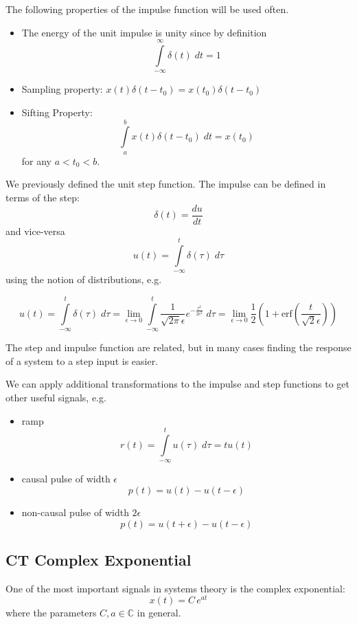 The following properties of the impulse function will be used often.

\begin{itemize}
\item The energy of the unit impulse is unity since by definition
  \[
  \int\limits_{-\infty}^{\infty} \delta(t) \; dt = 1
  \]
\item Sampling property: $x(t)\delta(t-t_0) = x(t_0)\delta(t-t_0)$
\item Sifting Property:
  \[
  \int\limits_{a}^{b} x(t)\delta(t-t_0) \; dt = x(t_0)
  \]
  for any $a < t_0 < b$.
\end{itemize}

We previously defined the unit step function. The impulse can be defined in terms of the step:
\[
\delta(t) = \frac{du}{dt}
\]
and vice-versa
\[
u(t) = \int\limits_{-\infty}^{t} \delta(\tau) \; d\tau
\]
using the notion of distributions, e.g.

\[
u(t) = \int\limits_{-\infty}^{t} \delta(\tau) \; d\tau = \lim_{\epsilon \rightarrow 0} \int\limits_{-\infty}^{t} \frac{1}{\sqrt{2\pi}\epsilon} e^{-\frac{\tau^2}{2\epsilon^2}} \; d\tau = \lim_{\epsilon \rightarrow 0} \frac{1}{2}\left(1+\text{erf}\left( \frac{t}{\sqrt{2}\epsilon}\right)\right)
\]

The step and impulse function are related, but in many cases finding the response of a system to a step input is easier.

We can apply additional transformations to the impulse and step functions to get other useful signals, e.g.

\begin{itemize}
\item ramp
  \[
  r(t) = \int\limits_{-\infty}^{t} u(\tau) \; d\tau = tu(t)
  \]
  
\item causal pulse of width $\epsilon$
  \[
  p(t) = u(t) - u(t-\epsilon)
  \]
  
\item non-causal pulse of width $2\epsilon$
  \[
      p(t) = u(t+\epsilon) - u(t-\epsilon)
      \]
\end{itemize}

\subsection{CT Complex Exponential}

One of the most important signals in systems theory is the complex exponential:
\[
x(t) = C\, e^{a t}
\]
where the parameters $C, a \in \mathbb{C}$ in general.

